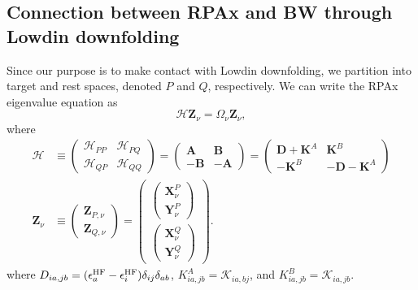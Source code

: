 \subsection{Connection between RPAx and BW through Lowdin downfolding}
Since our purpose is to make contact with Lowdin downfolding, we partition into target and rest spaces, denoted $P$ and $Q$, respectively. We can write the RPAx eigenvalue equation as
\begin{equation}
    \mathcal{H}
    \bm{Z}_{\nu}
    =
    \Omega_{\nu}
    \bm{Z}_{\nu},
    \label{eq:rpa_full_eigenproblem}
\end{equation}
where
\begin{align}
    \mathcal{H}&\equiv     \begin{pmatrix}
        \mathcal{H}_{PP} & \mathcal{H}_{PQ} \\
        \mathcal{H}_{QP} & \mathcal{H}_{QQ}
    \end{pmatrix}=
    \begin{pmatrix}
        \bm{A} & \bm{B} \\
        -\bm{B} & -\bm{A}
    \end{pmatrix}=
    \begin{pmatrix}
        \bm{D} + \bm{K}^A & \bm{K}^B \\
        -\bm{K}^B & -\bm{D} - \bm{K}^A
    \end{pmatrix} \\
\bm{Z}_{\nu}&\equiv
    \begin{pmatrix}
        \bm{Z}_{P,\nu} \\
        \bm{Z}_{Q,\nu}
    \end{pmatrix}=
    \begin{pmatrix}
        \begin{pmatrix} \bm{X}^P_{\nu} \\
        \bm{Y}^P_{\nu}
\end{pmatrix} \\
        \begin{pmatrix} \bm{X}^Q_{\nu} \\
        \bm{Y}^Q_{\nu}
\end{pmatrix}
    \end{pmatrix}.
\end{align}
where $D_{ia,jb} = (\epsilon_a^{\rm HF} - \epsilon_i^{\rm HF}) \delta_{ij}\delta_{ab}$, $K^A_{ia,jb} = \mathcal{K}_{ia,bj}$, and $K^B_{ia,jb} = \mathcal{K}_{ia,jb}$. 
